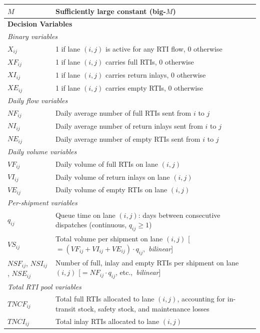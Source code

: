 \begin{longtable}{|p{}|p{}|}
$M$               & Sufficiently large constant (big-$M$) \\
\hline
\multicolumn{2}{|l|}{\textbf{Decision Variables}}\\ \hline
\multicolumn{2}{|l|}{\textit{Binary variables}}\\ \hline
$X_{ij}$     & 1 if lane $(i,j)$ is active for any RTI flow, 0 otherwise \\
$XF_{ij}$    & 1 if lane $(i,j)$ carries full RTIs, 0 otherwise \\
$XI_{ij}$    & 1 if lane $(i,j)$ carries return inlays, 0 otherwise \\
$XE_{ij}$    & 1 if lane $(i,j)$ carries empty RTIs, 0 otherwise \\
\hline
\multicolumn{2}{|l|}{\textit{Daily flow variables}}\\ \hline
$NF_{ij}$    & Daily average number of full RTIs sent from $i$ to $j$ \\
$NI_{ij}$    & Daily average number of return inlays sent from $i$ to $j$ \\
$NE_{ij}$    & Daily average number of empty RTIs sent from $i$ to $j$ \\
\hline
\multicolumn{2}{|l|}{\textit{Daily volume variables}}\\ \hline
$VF_{ij}$    & Daily volume of full RTIs on lane $(i,j)$ \\
$VI_{ij}$    & Daily volume of return inlays on lane $(i,j)$ \\
$VE_{ij}$    & Daily volume of empty RTIs on lane $(i,j)$ \\
\hline
\multicolumn{2}{|l|}{\textit{Per-shipment variables}}\\ \hline
$q_{ij}$     & Queue time on lane $(i,j)$: days between consecutive
               dispatches (continuous, $q_{ij} \geq 1$) \\
$VS_{ij}$    & Total volume per shipment on lane $(i,j)$
               [$= (VF_{ij}+VI_{ij}+VE_{ij})\cdot q_{ij}$,\ \textit{bilinear}] \\
$NSF_{ij}$, $NSI_{ij}$, $NSE_{ij}$ & Number of full, inlay and empty RTIs
               per shipment on lane $(i,j)$
               [$= NF_{ij}\cdot q_{ij}$, etc.,\ \textit{bilinear}] \\
\hline
\multicolumn{2}{|l|}{\textit{Total RTI pool variables}}\\ \hline
$TNCF_{ij}$  & Total full RTIs allocated to lane $(i,j)$, accounting for
               in-transit stock, safety stock, and maintenance losses \\
$TNCI_{ij}$  & Total inlay RTIs allocated to lane $(i,j)$ \\

\end{longtable}
